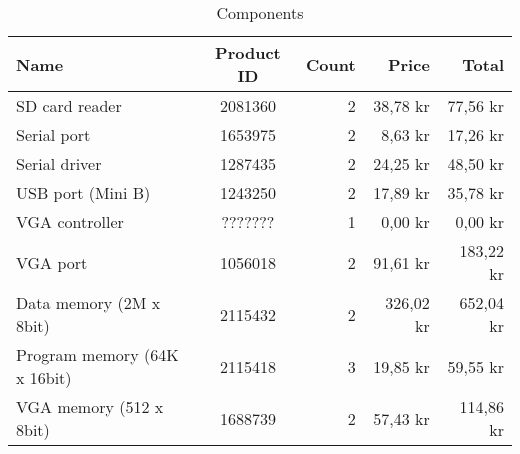 \begin{table}[h]
  \centering
  \begin{tabular}{| l || c | r | r | r |}\hline
    {\sc Name} & {\sc Product ID} & {\sc Count} & {\sc Price} & {\sc Total} 
    \\ \hline \hline
    SD card reader               & 2081360 & 2 &  38,78 kr &  77,56 kr \\ \hline
    Serial port                  & 1653975 & 2 &   8,63 kr &  17,26 kr \\ \hline
    Serial driver                & 1287435 & 2 &  24,25 kr &  48,50 kr \\ \hline
    USB port (Mini B)            & 1243250 & 2 &  17,89 kr &  35,78 kr \\ \hline
    VGA controller               & ??????? & 1 &   0,00 kr &   0,00 kr \\ \hline
    VGA port                     & 1056018 & 2 &  91,61 kr & 183,22 kr \\ \hline
    Data memory (2M x 8bit)      & 2115432 & 2 & 326,02 kr & 652,04 kr \\ \hline
    Program memory (64K x 16bit) & 2115418 & 3 &  19,85 kr &  59,55 kr \\ \hline
    VGA memory (512 x 8bit)      & 1688739 & 2 &  57,43 kr & 114,86 kr \\ \hline
  \end{tabular}
  \caption{Components}
  \label{fig:components}
\end{table}
